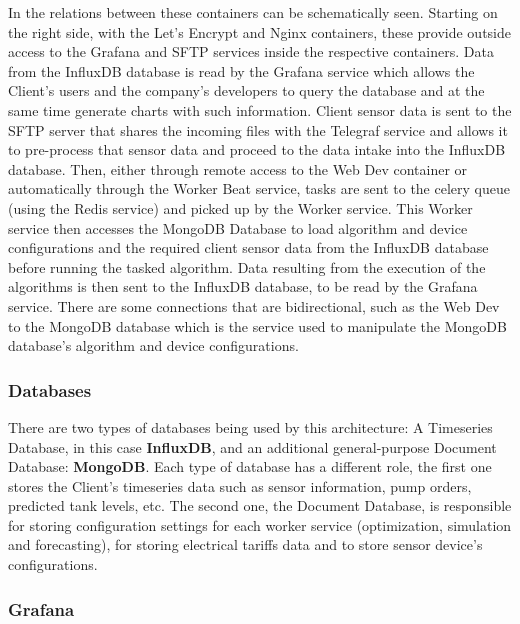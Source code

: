 In  the relations between these containers can be schematically seen. Starting on the right side, with the  Let's Encrypt and Nginx containers, these provide outside access to the Grafana and SFTP services inside the respective containers. Data from the InfluxDB database is read by the Grafana service which allows the Client's users and the company's developers to query the database and at the same time generate charts with such information. Client sensor data is sent to the SFTP server that shares the incoming files with the Telegraf service and allows it to pre-process that sensor data and proceed to the data intake into the InfluxDB database. Then, either through remote access to the Web Dev container or automatically through the Worker Beat service, tasks are sent to the celery queue (using the Redis service) and picked up by the Worker service. This Worker service then accesses the MongoDB Database to load algorithm and device configurations and the required client sensor data from the InfluxDB database before running the tasked algorithm. Data resulting from the execution of the algorithms is then sent to the InfluxDB database, to be read by the Grafana service. There are some connections that are bidirectional, such as the Web Dev to the MongoDB database which is the service used to manipulate the MongoDB database's algorithm and device configurations.




\subsubsection{Databases}\label{methodology:sss:databases}

There are two types of databases being used by this architecture: A Timeseries Database, in this case \textbf{InfluxDB}, and an additional general-purpose Document Database: \textbf{MongoDB}. Each type of database has a different role, the first one stores the Client's timeseries data such as sensor information, pump orders, predicted tank levels, etc.
The second one, the Document Database, is responsible for storing configuration settings for each worker service (optimization, simulation and forecasting), for storing electrical tariffs data and to store sensor device's configurations.

\subsubsection{Grafana}\label{methodology:sss:grafana}

